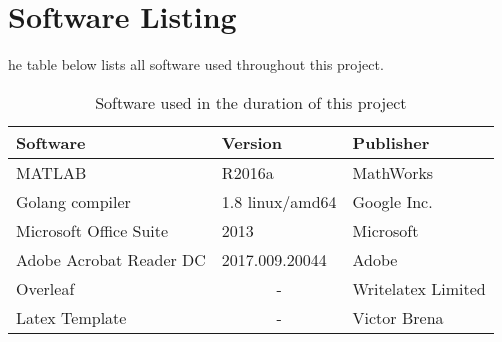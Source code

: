 \chapter{Software Listing}
\label{app:software}

he table below lists all software used throughout this project.

\bigskip
\bigskip

\begin{table}[ht]
\centering
\begin{tabular}{@{}lll@{}}
\toprule
\textbf{Software}       & \textbf{Version}      & \textbf{Publisher} \\ \midrule
MATLAB                  & R2016a                & MathWorks          \\
Golang compiler         & 1.8 linux/amd64       & Google Inc.        \\
Microsoft Office Suite  & 2013                  & Microsoft          \\
Adobe Acrobat Reader DC & 2017.009.20044        & Adobe              \\
Overleaf                & \multicolumn{1}{c}{-} & Writelatex Limited \\
Latex Template          & \multicolumn{1}{c}{-} & Victor Brena       \\ \bottomrule
\end{tabular}
\caption{Software used in the duration of this project}
\label{tab:software}
\end{table}